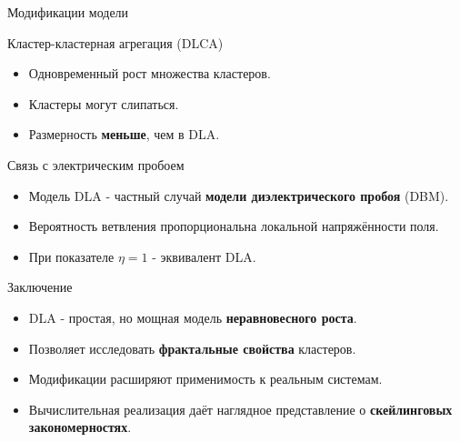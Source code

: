 \documentclass[
  ignorenonframetext,
  aspectratio=169,
  russian,
]{beamer}
\providecommand{\tightlist}{%
  \setlength{\itemsep}{0pt}\setlength{\parskip}{0pt}}
\begin{document}
\begin{frame}{Модификации модели}
\label{ux43cux43eux434ux438ux444ux438ux43aux430ux446ux438ux438-ux43cux43eux434ux435ux43bux438-1}
\begin{block}{Кластер-кластерная агрегация (DLCA)}
\label{ux43aux43bux430ux441ux442ux435ux440-ux43aux43bux430ux441ux442ux435ux440ux43dux430ux44f-ux430ux433ux440ux435ux433ux430ux446ux438ux44f-dlca}
\begin{itemize}[<+->]
\tightlist
\item
  Одновременный рост множества кластеров.
\item
  Кластеры могут слипаться.
\item
  Размерность \textbf{меньше}, чем в DLA.
\end{itemize}
\end{block}
\end{frame}

\begin{frame}{Связь с электрическим пробоем}
\label{ux441ux432ux44fux437ux44c-ux441-ux44dux43bux435ux43aux442ux440ux438ux447ux435ux441ux43aux438ux43c-ux43fux440ux43eux431ux43eux435ux43c}
\begin{itemize}[<+->]
\tightlist
\item
  Модель DLA - частный случай \textbf{модели диэлектрического пробоя}
  (DBM).
\item
  Вероятность ветвления пропорциональна локальной напряжённости поля.
\item
  При показателе \(\eta = 1\) - эквивалент DLA.
\end{itemize}
\end{frame}

\begin{frame}{Заключение}
\label{ux437ux430ux43aux43bux44eux447ux435ux43dux438ux435}
\begin{itemize}[<+->]
\tightlist
\item
  DLA - простая, но мощная модель \textbf{неравновесного роста}.
\item
  Позволяет исследовать \textbf{фрактальные свойства} кластеров.
\item
  Модификации расширяют применимость к реальным системам.
\item
  Вычислительная реализация даёт наглядное представление о
  \textbf{скейлинговых закономерностях}.
\end{itemize}
\end{frame}
\end{document}

